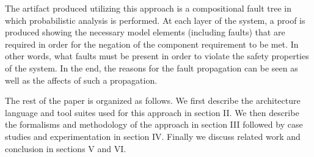 The artifact produced utilizing this approach is a compositional fault tree in which probabilistic analysis is performed. At each layer of the system, a proof is produced showing the necessary model elements (including faults) that are required in order for the negation of the component requirement to be met. In other words, what faults must be present in order to violate the safety properties of the system. In the end, the reasons for the fault propagation can be seen as well as the affects of such a propagation. 

The rest of the paper is organized as follows. We first describe the architecture language and tool suites used for this approach in section II. We then describe the formalisms and methodology of the approach in section III followed by case studies and experimentation in section IV. Finally we discuss related work and conclusion in sections V and VI.  

